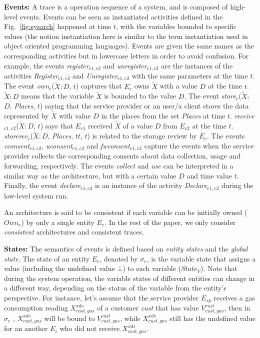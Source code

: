 \documentclass[a4paper]{article}
\begin{document}
\textbf{Events:}  A trace is a operation sequence of a system, and is composed of high-level events. Events can be seen as instantiated activities defined in the Fig.~\ref{fig:sysarch} happened at time $t$, with the variables bounded to specific values (the notion instantiation here is  similar to the term instantiation used in object oriented programming languages). Events are given the same names as the corresponding activities but in lowercase letters in order to avoid confusion.  For example, the events \textit{register}$_{e1,e2}$ and \textit{unregister}$_{e1,e2}$ are the instances of the activities  \textit{Register}$_{e1,e2}$ and \textit{Unregister}$_{e1,e2}$ with the same parameters at the time $t$. The event \textit{own}$_{e}$($\tilde{X}$$:$$D$, $t$) captures  that $E_{e}$ owns $\tilde{X}$ with a value $D$ at the time $t$. $\tilde{X}$$:$$D$ means that the variable $\tilde{X}$ is bounded to the value $D$. The event \textit{store}$_{e}$($\tilde{X}$$:$$D$, \textit{Places}, $t$) saying that the service provider or an user/a client stores the data represented by $\tilde{X}$ with value $D$ in the places from the set \textit{Places} at time $t$.  \textit{receive}$_{e1,e2}$($\tilde{X}$$:$$D$, $t$) says that $E_{e1}$ received $\tilde{X}$ of a value $D$ from $E_{e2}$ at the time $t$. \textit{storerev}$_{e}$($\tilde{X}$$:$$D$, \textit{Places}, $tt$, $t$) is related to the storage review by $E_e$.  The events \textit{cconsent}$_{e1, e2}$, \textit{uconsent}$_{e1, e2}$ and \textit{fwconsent}$_{e1, e2}$ capture the events when the service provider collects the corresponding consents about data collection, usage and forwarding, respectively. The events \textit{collect} and \textit{use} can be interpreted in a similar way as the architecture, but with a certain value $D$ and time value $t$. 
Finally, the event \textit{declare}$_{e1, e2}$ is an instance of the activity \textit{Declare}$_{e1, e2}$ during the low-level system run.

An architecture is said to be consistent if each variable can be initially owned ($\textit{Own}_{e}$) by only a single entity $E_e$. In the rest of the paper,  we only consider \textit{consistent} architectures and consistent traces. 


\textbf{States:} The semantics of events is defined based on \textit{entity states} and the \textit{global state}. The state of an entity $E_e$, denoted by $\sigma_e$, is the variable state that assigns a value (including the undefined value $\bot$) to each variable ($\textit{State}_V$). Note that during the system operation, the variable states of different entities can change in a different way, depending on the status of the variable from the entity's perspective. For instance, let's assume that the service provider $E_{sp}$ receives a gas consumption reading $X^{xds}_{cust, gas}$ of a customer \textit{cust} that has value $V^{cust}_{cust, gas}$, then in $\sigma_e$ , $X^{xds}_{cust, gas}$ will be bound to $V^{cust}_{cust, gas}$, while $X^{xds}_{cust, gas}$ still has the undefined value for an another $E_i$ who did not receive $X^{xds}_{cust, gas}$. 
\end{document}
